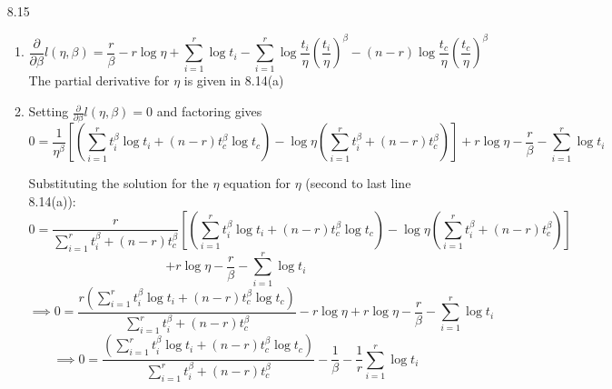 \documentclass[12pt]{article}\usepackage[]{graphicx}\usepackage[]{color}
\begin{document}
\begin{enumerate}
\item[8.15]
\begin{enumerate}
\item 
\[\frac{\partial}{\partial \beta} l(\eta,\beta) =  \frac{r}{\beta} - r\log \eta + \sum_{i=1}^r\log t_i  - \sum_{i=1}^r \log\frac{t_i}{\eta}\left(\frac{t_i}{\eta}\right)^\beta - (n-r) \log \frac{t_c}{\eta} \left(\frac{t_c}{\eta}\right)^\beta\]
The partial derivative for $\eta$ is given in 8.14(a)

\item Setting $\frac{\partial}{\partial \beta} l(\eta,\beta) = 0 $ and factoring gives
\[0 = \frac{1}{\eta^{\beta}} \left[ \left(\sum_{i=1}^r  t_i^\beta \log t_i + (n-r)  t_c^\beta \log t_c \right)  - \log \eta \left( \sum_{i=1}^r t_i^\beta + (n-r) t_c^\beta\right)\right] + r\log \eta - \frac{r}{\beta} - \sum_{i=1}^r \log t_i\]

Substituting the solution for the $\eta$ equation for $\eta$ (second to last line 8.14(a)):
\[0 = \frac{r}{\sum_{i=1}^r t_i^\beta + (n-r) t_c^\beta} \left[ \left(\sum_{i=1}^r  t_i^\beta \log t_i + (n-r)  t_c^\beta \log t_c \right)  - \log \eta \left( \sum_{i=1}^r t_i^\beta + (n-r) t_c^\beta\right)  \right]\]
\[ + r\log \eta - \frac{r}{\beta} - \sum_{i=1}^r \log t_i\]
\[\implies 0 = \frac{r\left(\sum_{i=1}^r  t_i^\beta \log t_i + (n-r)  t_c^\beta \log t_c \right)}{\sum_{i=1}^r t_i^\beta + (n-r) t_c^\beta} - r\log \eta + r\log \eta - \frac{r}{\beta} - \sum_{i=1}^r \log t_i\]
\[\implies 0 = \frac{\left(\sum_{i=1}^r  t_i^\beta \log t_i + (n-r)  t_c^\beta \log t_c \right)}{\sum_{i=1}^r t_i^\beta + (n-r) t_c^\beta} - \frac{1}{\beta} - \frac{1}{r}\sum_{i=1}^r \log t_i\]
\end{enumerate}

\end{enumerate}
\end{document}
